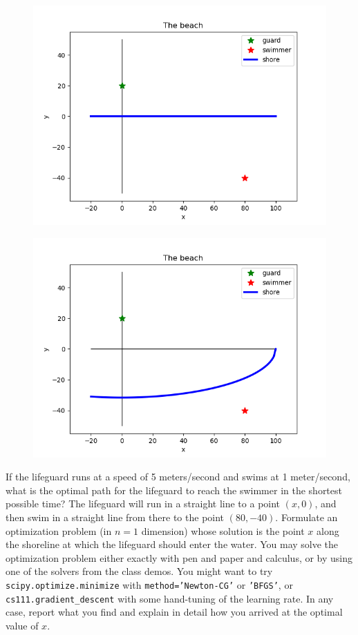 \documentclass[11pt]{article}
\begin{document}
\begin{figure}[t]
\centering
\begin{minipage}{.5\textwidth}
  \centering
  \includegraphics[width=.65\linewidth]{StraightBeach}
  \label{fig:geometric}
\end{minipage}%
\begin{minipage}{.5\textwidth}
  \centering
  \includegraphics[width=.65\linewidth]{CurvedBeach}
  \label{fig:spectral}
\end{minipage}
\end{figure}

If the lifeguard runs at a speed of 5 meters/second and swims 
at 1 meter/second, what is the optimal path for the lifeguard
to reach the swimmer in the shortest possible time? 
The lifeguard will run in a straight line to a point $(x,0)$, 
and then swim in a straight line from there to the point $(80,-40)$.
Formulate an optimization problem (in $n=1$ dimension) whose solution is
the point $x$ along the shoreline at which the lifeguard should
enter the water. You may solve the optimization problem either
exactly with pen and paper and calculus, 
or by using one of the solvers from the class demos. 
You might want to try {\tt scipy.optimize.minimize}
with {\tt method='Newton-CG'} or {\tt 'BFGS'}, 
or {\tt cs111.gradient\_descent}
with some hand-tuning of the learning rate.
In any case, report what you find and explain in detail
how you arrived at the optimal value of $x$.
\end{document}
